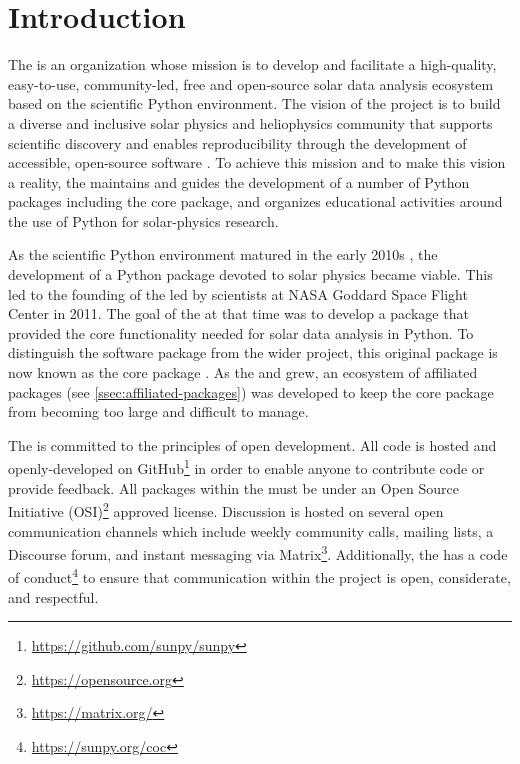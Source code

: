 \section{Introduction}
\label{sec:introduction}

The \sunpyproj is an organization whose mission is to develop and facilitate a high-quality, easy-to-use, community-led, free and open-source solar data analysis ecosystem based on the scientific Python environment.
The vision of the project is to build a diverse and inclusive solar physics and heliophysics community that supports scientific discovery and enables reproducibility through the development of accessible, open-source software \citep{bobra_monica_2020_7020094}.
To achieve this mission and to make this vision a reality, the \sunpyproj maintains and guides the development of a number of Python packages including the \sunpypkg core package, and organizes educational activities around the use of Python for solar-physics research.

As the scientific Python environment matured in the early 2010s \citep{Hunter:2007, harris2020array, 2020SciPy-NMeth}, the development of a Python package devoted to solar physics became viable.
This led to the founding of the \sunpyproj led by scientists at NASA Goddard Space Flight Center in 2011.
The goal of the \sunpyproj at that time was to develop a package that provided the core functionality needed for solar data analysis in Python.
To distinguish the software package from the wider project, this original package is now known as the \sunpypkg core package \citep{sunpy_community2020}.
As the \sunpyproj and \sunpypkg grew, an ecosystem of affiliated packages (see \autoref{ssec:affiliated-packages}) was developed to keep the \sunpypkg core package from becoming too large and difficult to manage.

The \sunpyproj is committed to the principles of open development.
All code is hosted and openly-developed on GitHub\footnote{\url{https://github.com/sunpy/sunpy}} in order to enable anyone to contribute code or provide feedback.
All packages within the \sunpyproj must be under an Open Source Initiative (OSI)\footnote{\url{https://opensource.org}} approved license.
Discussion is hosted on several open communication channels which include weekly community calls, mailing lists, a Discourse forum, and instant messaging via Matrix\footnote{\url{https://matrix.org/}}.
Additionally, the \sunpyproj has a code of conduct\footnote{\url{https://sunpy.org/coc}} to ensure that communication within the project is open, considerate, and respectful.

